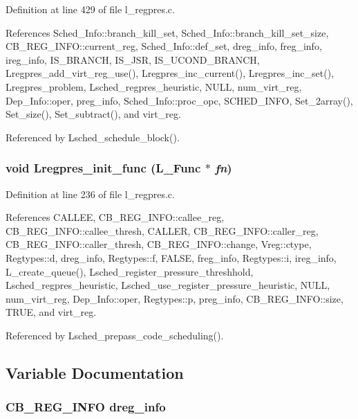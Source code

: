 Definition at line 429 of file l\_\-regpres.c.

References Sched\_\-Info::branch\_\-kill\_\-set, Sched\_\-Info::branch\_\-kill\_\-set\_\-size, CB\_\-REG\_\-INFO::current\_\-reg, Sched\_\-Info::def\_\-set, dreg\_\-info, freg\_\-info, ireg\_\-info, IS\_\-BRANCH, IS\_\-JSR, IS\_\-UCOND\_\-BRANCH, Lregpres\_\-add\_\-virt\_\-reg\_\-use(), Lregpres\_\-inc\_\-current(), Lregpres\_\-inc\_\-set(), Lregpres\_\-problem, Lsched\_\-regpres\_\-heuristic, NULL, num\_\-virt\_\-reg, Dep\_\-Info::oper, preg\_\-info, Sched\_\-Info::proc\_\-opc, SCHED\_\-INFO, Set\_\-2array(), Set\_\-size(), Set\_\-subtract(), and virt\_\-reg.

Referenced by Lsched\_\-schedule\_\-block().
\subsubsection{\setlength{\rightskip}{0pt plus 5cm}void Lregpres\_\-init\_\-func (L\_\-Func $\ast$ {\em fn})}\label{l__regpres_8c_9fce931a4a1c83c5e81f5f4c81cf59d3}




Definition at line 236 of file l\_\-regpres.c.

References CALLEE, CB\_\-REG\_\-INFO::callee\_\-reg, CB\_\-REG\_\-INFO::callee\_\-thresh, CALLER, CB\_\-REG\_\-INFO::caller\_\-reg, CB\_\-REG\_\-INFO::caller\_\-thresh, CB\_\-REG\_\-INFO::change, Vreg::ctype, Regtypes::d, dreg\_\-info, Regtypes::f, FALSE, freg\_\-info, Regtypes::i, ireg\_\-info, L\_\-create\_\-queue(), Lsched\_\-register\_\-pressure\_\-threshhold, Lsched\_\-regpres\_\-heuristic, Lsched\_\-use\_\-register\_\-pressure\_\-heuristic, NULL, num\_\-virt\_\-reg, Dep\_\-Info::oper, Regtypes::p, preg\_\-info, CB\_\-REG\_\-INFO::size, TRUE, and virt\_\-reg.

Referenced by Lsched\_\-prepass\_\-code\_\-scheduling().

\subsection{Variable Documentation}
\subsubsection{\setlength{\rightskip}{0pt plus 5cm}\bf{CB\_\-REG\_\-INFO} \bf{dreg\_\-info}}\label{l__regpres_8c_3c2afab1c79a0e20251f42283e7ad216}




